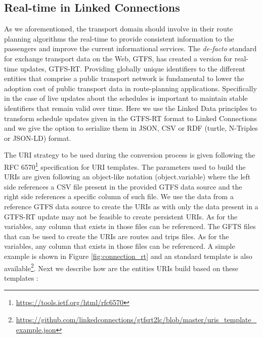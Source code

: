 \documentclass[sw]{iosart2x}
\begin{document}
\subsection{Real-time in Linked Connections}\label{real_time_lc}

As we aforementioned, the transport domain should involve in their route planning algorithms the real-time to provide consistent information to the passengers and improve the current  informational services.  The \textit{de-facto} standard for exchange transport data on the Web, GTFS, has created a version for real-time updates, GTFS-RT.  
Providing globally unique identifiers to the different entities that comprise a public transport network is fundamental to lower the adoption cost of public transport data in route-planning applications. Specifically in the case of live updates about the schedules is important to maintain stable identifiers that remain valid over time. Here we use the Linked Data principles to transform schedule updates given in the GTFS-RT format to Linked Connections and we give the option to serialize them in JSON, CSV or RDF (turtle, N-Triples or JSON-LD) format.

The URI strategy to be used during the conversion process is given following the RFC 6570\footnote{\url{https://tools.ietf.org/html/rfc6570}} specification for URI templates. The parameters used to build the URIs are given following an object-like notation (object.variable) where the left side references a CSV file present in the provided GTFS data source and the right side references a specific column of such file. We use the data from a reference GTFS data source to create the URIs as with only the data present in a GTFS-RT update may not be feasible to create persistent URIs. As for the variables, any column that exists in those files can be referenced. The GFTS files that can be used to create the URIs are routes and trips files. As for the variables, any column that exists in those files can be referenced. A simple example is shown in Figure \ref{fig:connection_rt} and an standard template is also available\footnote{\url{https://github.com/linkedconnections/gtfsrt2lc/blob/master/uris_template_example.json}}. Next we describe how are the entities URIs build based on these templates :
\end{document}

